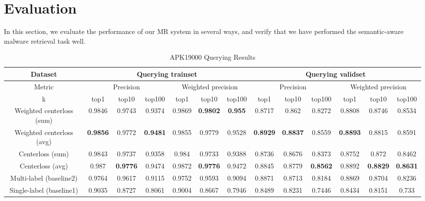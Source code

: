 \section{Evaluation}
In this section, we evaluate the performance of our MR system in several ways, and verify that we have performed the semantic-aware malware retrieval task well.

\begin{table*}[!htb]%
\caption{APK19000 Querying Results}
\label{tab:apk_result}
\begin{minipage}{\textwidth}
\begin{center}
\begin{tabular}{|c|c|c|c|c|c|c|c|c|c|c|c|c|}
\hline
Dataset             & \multicolumn{6}{c|}{Querying trainset}                      & \multicolumn{6}{c|}{Querying validset}                      \\ \hline
Metric              & \multicolumn{3}{c|}{Precision}  & \multicolumn{3}{c|}{Weighted precision} & \multicolumn{3}{c|}{Precision}  & \multicolumn{3}{c|}{Weighted precision} \\ \hline
k              & top1   & top10  & top100 & top1      & top10     & top100   & top1   & top10  & top100 & top1      & top10     & top100   \\ \hline
Weighted centerloss (sum)  & 0.9846 & 0.9743 & 0.9374 & 0.9869    & \textbf{0.9802}   & \textbf{0.955}    & 0.8717 & 0.862  & 0.8272 & 0.8808    & 0.8746    & 0.8534   \\ \hline
Weighted centerloss (avg) & \textbf{0.9856} & 0.9772 & \textbf{0.9481} & 0.9855    & 0.9779    & 0.9528   & \textbf{0.8929 }& \textbf{0.8837 }& 0.8559 & \textbf{0.8893   } & 0.8815    & 0.8591   \\ \hline
Centerloss (sum)         & 0.9843 & 0.9737 & 0.9358 & 0.984     & 0.9733    & 0.9388   & 0.8736 & 0.8676 & 0.8373 & 0.8752    & 0.872     & 0.8462   \\ \hline
Centerloss (avg)        & 0.987  & \textbf{0.9776} & 0.9474 & 0.9872    & \textbf{0.9776}    & 0.9472   & 0.8845 & 0.8779 & \textbf{0.8562} & 0.8892    & \textbf{0.8829}    & \textbf{0.8631}   \\ \hline
Multi-label (baseline2)               & 0.9764 & 0.9617 & 0.9115 & 0.9752    & 0.9593    & 0.9094   & 0.8871 & 0.8713 & 0.8184 & 0.8869    & 0.8704    & 0.8236   \\ \hline
Single-label (baseline1)              & 0.9035 & 0.8727 & 0.8061 & 0.9004    & 0.8667    & 0.7946   & 0.8489 & 0.8231 & 0.7446 & 0.8434    & 0.8151    & 0.733    \\ \hline
\end{tabular}
\end{center}
\bigskip\centering
\end{minipage}
\end{table*}%


